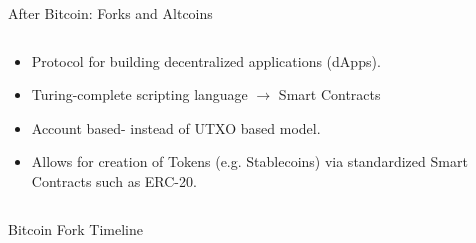 \documentclass[]{beamer}
\begin{document}
\begin{frame}{After Bitcoin: Forks and Altcoins}
\begin{columns}
		\vspace{0.5em}
		\begin{small}
			\begin{itemize}
				\item Protocol for building decentralized applications (dApps).
				\item Turing-complete scripting language $\rightarrow$ Smart Contracts
				\item Account based- instead of UTXO based model.
				\item Allows for creation of Tokens (e.g. Stablecoins) via standardized Smart Contracts such as ERC-20.
			\end{itemize}
		\end{small}
	\end{columns}	
\end{frame}


\begin{frame}{Bitcoin Fork Timeline}
	\begin{figure}[h!]
	\center
		\begin{tikzpicture}[scale=0.65, every node/.style={scale=0.65}]
			
  		\end{tikzpicture}
		\label{fig:forkhistory}
	\end{figure}
\end{frame}



%	
		
\end{document}
